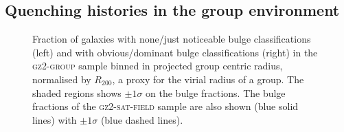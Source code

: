 


\subsection{Quenching histories in the group environment}

\begin{figure}
\caption{Fraction of galaxies with none/just noticeable bulge classifications (left) and with obvious/dominant bulge classifications (right) in the \textsc{gz2-group} sample binned in projected group centric radius, normalised by $R_{200}$, a proxy for the virial radius of a group. The shaded regions shows $\pm1\sigma$ on the bulge fractions. The bulge fractions of the \textsc{gz2-sat-field} sample are also shown (blue solid lines) with $\pm1\sigma$ (blue dashed lines).}
\label{fig:bulgeradius}
\end{figure}

